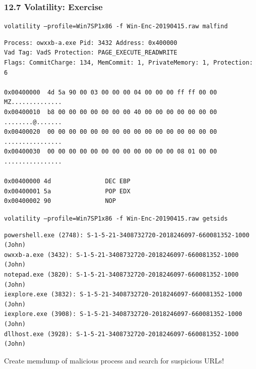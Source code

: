 \begin{frame}[fragile]
  \frametitle{12.7 Volatility: Exercise}
      \texttt{\footnotesize volatility --profile=Win7SP1x86 -f Win-Enc-20190415.raw malfind}
      \begin{lstlisting}[basicstyle=\tiny]
Process: owxxb-a.exe Pid: 3432 Address: 0x400000
Vad Tag: VadS Protection: PAGE_EXECUTE_READWRITE
Flags: CommitCharge: 134, MemCommit: 1, PrivateMemory: 1, Protection: 6

0x00400000  4d 5a 90 00 03 00 00 00 04 00 00 00 ff ff 00 00   MZ..............
0x00400010  b8 00 00 00 00 00 00 00 40 00 00 00 00 00 00 00   ........@.......
0x00400020  00 00 00 00 00 00 00 00 00 00 00 00 00 00 00 00   ................
0x00400030  00 00 00 00 00 00 00 00 00 00 00 00 08 01 00 00   ................

0x00400000 4d               DEC EBP
0x00400001 5a               POP EDX
0x00400002 90               NOP

      \end{lstlisting}
      \texttt{\footnotesize volatility --profile=Win7SP1x86 -f Win-Enc-20190415.raw getsids}
      \begin{lstlisting}[basicstyle=\tiny]
powershell.exe (2748): S-1-5-21-3408732720-2018246097-660081352-1000 (John)
owxxb-a.exe (3432): S-1-5-21-3408732720-2018246097-660081352-1000 (John)
notepad.exe (3820): S-1-5-21-3408732720-2018246097-660081352-1000 (John)
iexplore.exe (3832): S-1-5-21-3408732720-2018246097-660081352-1000 (John)
iexplore.exe (3908): S-1-5-21-3408732720-2018246097-660081352-1000 (John)
dllhost.exe (3928): S-1-5-21-3408732720-2018246097-660081352-1000 (John)

      \end{lstlisting}
	\footnotesize{Create memdump of malicious process and search for suspicious URLs!}
\end{frame}







